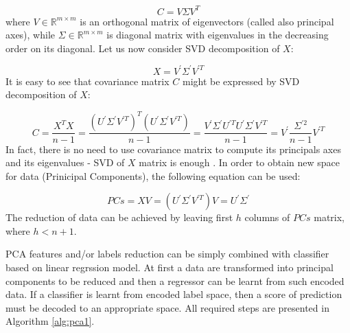 \begin{equation}\label{eq:pca1}
    C=V\Sigma{V^T}
\end{equation}
where $V \in \mathbb{R}^{m \times m}$ is an orthogonal matrix of eigenvectors (called also principal axes), while $\Sigma \in \mathbb{R}^{m \times m}$ is diagonal matrix with eigenvalues in the decreasing order on its diagonal. 
Let us now consider SVD decomposition of $X$:

\begin{equation}\label{eq:pca2}
    X=V^{'}\Sigma^{'}{V^{'T}}
\end{equation}
It is easy to see that covariance matrix $C$ might be expressed by SVD decomposition of $X$:

\begin{equation}\label{eq:pca3}
    C=\frac{X^TX}{n-1} = \frac{(U^{\prime}\Sigma^{\prime}V^{\prime T})^T(U^{\prime}\Sigma^{\prime}V^{\prime T})}{n-1} = \frac{V^{\prime}\Sigma^{\prime}U^{\prime T}U^{\prime}\Sigma^{\prime}V^{\prime T}}{n-1} = V^{\prime}\frac{\Sigma^{\prime 2}}{n-1}V^{\prime T} 
\end{equation}
In fact, there is no need to use covariance matrix to compute its principals axes and its eigenvalues - SVD of $X$ matrix is enough \cite{Jolliffe}. In order to obtain new space for data (Prinicipal Components), the following equation can be used:

\begin{equation}\label{eq:pca4}
    PCs = XV = (U^{'}\Sigma^{'}V^{'T})V = U^{'}\Sigma^{'} 
\end{equation}
The reduction of data can be achieved by leaving first $h$ columns of $PCs$ matrix, where $h<n+1$.

PCA features and/or labels reduction can be simply combined with classifier based on linear regrssion model. At first a data are transformed into principal components to be reduced and then a regressor can be learnt from such encoded data. If a classifier is learnt from encoded label space, then a score of prediction must be decoded to an appropriate space. All required steps are presented in Algorithm \ref{alg:pca1}.

